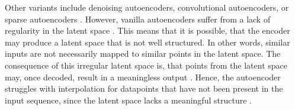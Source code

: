 Other variants include denoising autoencoders, convolutional autoencoders, or sparse autoencoders \cite{maheshwari2022AutoencoderIssuesChallenges, Goodfellow-et-al-2016}.
However, vanilla autoencoders suffer from a lack of regularity in the latent space \cite{razghandi2022VariationalAutoencoderGenerativea}.
This means that it is possible, that the encoder may produce a latent space that is not well structured.
In other words, similar inputs are not necessarily mapped to similar points in the latent space.
The consequence of this irregular latent space is, that points from the latent space may, once decoded, result in a meaningless output \cite{rocca2019UnderstandingVariationalAutoencoders}.
Hence, the autoencoder struggles with interpolation for datapoints that have not been present in the input sequence, since the latent space lacks a meaningful structure \cite{razghandi2022VariationalAutoencoderGenerativea}.

